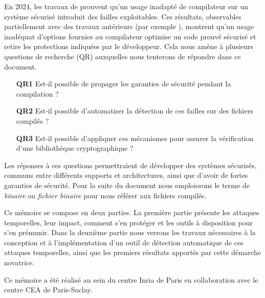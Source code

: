 En 2024, les travaux de \citeauthor{schneider2024breakingbadcompilersbreak} \cite{schneider2024breakingbadcompilersbreak} prouvent qu'un usage inadapté de compilateur sur un système sécurisé introduit des failles exploitables. Ces résultats, observables partiellement avec des travaux antérieurs (par exemple \cite{binsecRel2019}), montrent qu'un usage inadéquat d'options fournies au compilateur optimise un code prouvé sécurisé et retire les protections indiquées par le développeur. Cela nous amène à plusieurs questions de recherche (QR) auxquelles nous tenterons de répondre dans ce document.
\begin{enumerate}
    \item[\textbf{QR1}] Est-il possible de propager les garanties de sécurité pendant la compilation ?
    \item[\textbf{QR2}] Est-il possible d'automatiser la détection de ces failles sur des fichiers compilés ?
    \item[\textbf{QR3}] Est-il possible d'appliquer ces mécanismes pour assurer la vérification d'une bibliothèque cryptographique ?
\end{enumerate}

Les réponses à ces questions permettraient de développer des systèmes sécurisés, communs entre différents supports et architectures, ainsi que d'avoir de fortes garanties de sécurité. Pour la suite du document nous emploierons le terme de \textit{binaire} ou \textit{fichier binaire} pour nous référer aux fichiers compilés.\smallbreak

Ce mémoire se compose en deux parties. La première partie présente les attaques temporelles, leur impact, comment s'en protéger et les outils à disposition pour s'en prémunir. Dans la deuxième partie nous verrons les travaux nécessaires à la conception et à l'implémentation d'un outil de détection automatique de ces attaques temporelles, ainsi que les premiers résultats apportés par cette démarche novatrice.\medbreak

Ce mémoire a été réalisé au sein du centre Inria de Paris en collaboration avec le centre CEA de Paris-Saclay.

